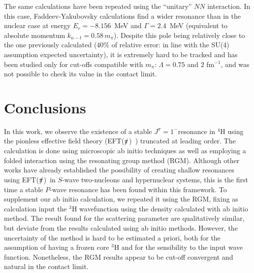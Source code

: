 \documentclass[5p,times]{elsarticle}
\newcommand{\eftnopi}{\mbox{EFT($\slashed{\pi}$) }}
\begin{document}
%
The same calculations have been repeated using the ``unitary'' $NN$ interaction. In this case, Faddeev-Yakubovsky calculations find a wider resonance than in the nuclear case at energy $E_r=-8.156$~MeV and $\Gamma=2.4$~MeV (equivalent to absolute momentum $k_{n-t}=0.58\,m_\pi$). 
Despite this pole being relatively close to the one previously calculated (40\% of relative error: in line with the SU(4) assumption expected uncertainty), it is extremely hard to be tracked and has been studied only for cut-offs compatible with $m_\pi$: $\Lambda=0.75$ and $2$ fm$^{-1}$, and was not possible to check its value in the contact limit.


\section{Conclusions}
%
In this work, we observe the existence of a stable $J^{\pi}=1^-$resonance in $^4$H using the pionless effective field theory (\eftnopi) truncated at leading order. The calculation is done using microscopic ab initio techniques as well as employing a folded interaction using the resonating group method (RGM).
%
Although other works have already established the possibility of creating shallow resonances using \eftnopi in $S$-wave two-nucleons and hypernuclear systems, this is the first time a stable $P$-wave
resonance has been found within this framework. 
%
To supplement our ab initio calculation, we repeated it using the RGM, fixing as calculation input the $^3$H wavefunction using the density calculated with ab initio method.
The result found for the scattering parameter are qualitatively similar, but deviate from the results calculated using ab initio methods.
However, the uncertainty of the method is hard to be estimated a priori, both for the assumption of having a frozen core $^3$H and for the sensibility to the input wave function.
Nonetheless, the RGM results appear to be cut-off convergent and natural in the contact limit.
%
\end{document}
